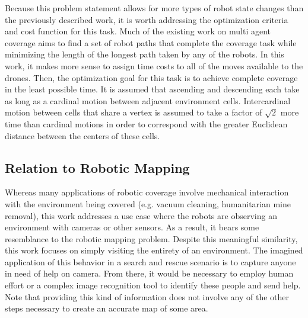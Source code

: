 Because this problem statement allows for more types of robot state changes than the previously described work, it is worth addressing the optimization criteria and cost function for this task. Much of the existing work on multi agent coverage aims to find a set of robot paths that complete the coverage task while minimizing the length of the longest path taken by any of the robots. In this work, it makes more sense to assign time costs to all of the moves available to the drones. Then, the optimization goal for this task is to achieve complete coverage in the least possible time. It is assumed that ascending and descending each take as long as a cardinal motion between adjacent environment cells. Intercardinal motion between cells that share a vertex is assumed to take a factor of $ \sqrt{2} $ more time than cardinal motions in order to correspond with the greater Euclidean distance between the centers of these cells.

\subsection{Relation to Robotic Mapping}

Whereas many applications of robotic coverage involve mechanical interaction with the environment being covered (e.g. vacuum cleaning, humanitarian mine removal), this work addresses a use case where the robots are observing an environment with cameras or other sensors. As a result, it bears some resemblance to the robotic mapping problem. Despite this meaningful similarity, this work focuses on simply visiting the entirety of an environment. The imagined application of this behavior in a search and rescue scenario is to capture anyone in need of help on camera. From there, it would be necessary to employ human effort or a complex image recognition tool to identify these people and send help. Note that providing this kind of information does not involve any of the other steps necessary to create an accurate map of some area.

